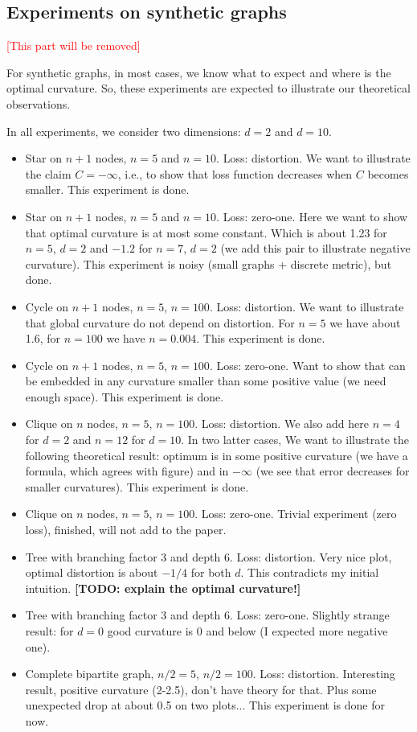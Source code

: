 \documentclass{article} %
\begin{document}
\subsection{Experiments on synthetic graphs}

\textcolor{red}{[This part will be removed]}

For synthetic graphs, in most cases, we know what to expect and where is the optimal curvature. So, these experiments are expected to illustrate our theoretical observations. 

In all experiments, we consider two dimensions: $d = 2$ and $d = 10$.

\begin{itemize}
    \item Star on $n+1$ nodes, $n = 5$ and $n = 10$. Loss: distortion. 
    We want to illustrate the claim $C = -\infty$, i.e., to show that loss function decreases when $C$ becomes smaller. This experiment is done. 
    \item Star on $n+1$ nodes, $n = 5$ and $n = 10$. Loss: zero-one. Here we want to show that optimal curvature is at most some constant. Which is about 1.23 for $n=5$, $d = 2$ and $-1.2$ for $n = 7$, $d = 2$ (we add this pair to illustrate negative curvature). This experiment is noisy (small graphs + discrete metric), but done. 
    \item Cycle on $n+1$ nodes, $n = 5$, $n = 100$. Loss: distortion. We want to illustrate that global curvature do not depend on distortion. For $n = 5$ we have about 1.6, for $n = 100$ we have $n = 0.004$. This experiment is done.
    \item Cycle on $n+1$ nodes, $n = 5$, $n = 100$. Loss: zero-one. Want to show that can be embedded in any curvature smaller than some positive value (we need enough space). This experiment is done.
    \item Clique on $n$ nodes, $n = 5$, $n = 100$. Loss: distortion. We also add here $n = 4$ for $d = 2$ and $n = 12$ for $d = 10$. In two latter cases, We want to illustrate the following theoretical result: optimum is in some positive curvature (we have a formula, which agrees with figure) and in $-\infty$ (we see that error decreases for smaller curvatures). This experiment is done.
   \item Clique on $n$ nodes, $n = 5$, $n = 100$. Loss: zero-one. Trivial experiment (zero loss), finished, will not add to the paper.
   \item Tree with branching factor $3$ and depth $6$. Loss: distortion. Very nice plot, optimal distortion is about $-1/4$ for both $d$. This contradicts my initial intuition. \textbf{[TODO: explain the optimal curvature!]}
   \item Tree with branching factor $3$ and depth $6$. Loss: zero-one. Slightly strange result: for $d = 0$ good curvature is 0 and below  (I expected more negative one). 
   \item Complete bipartite graph, $n/2 = 5$, $n/2 = 100$. Loss: distortion. Interesting result, positive curvature (2-2.5), don't have theory for that. Plus some unexpected drop at about 0.5 on two plots... This experiment is done for now. 
\end{itemize}
\end{document}
